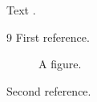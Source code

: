 \documentclass{article}
\begin{document}
Text \cite{a,b}.
\begin{thebibliography}{9}
 First reference.
\begin{figure}
\caption{A figure.}
\end{figure}
 Second reference.
\end{thebibliography}
\end{document}

